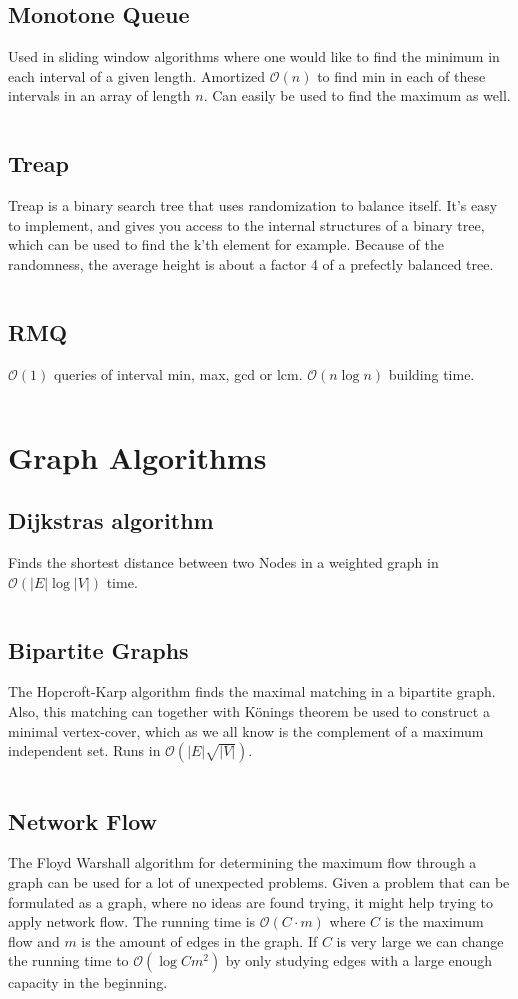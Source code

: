 \documentclass[8pt,a4paper,landscape,oneside]{amsart}
\newcommand{\codej}[1]{\inputminted[fontsize=\large,tabsize=2,baselinestretch=1]{java}{code/#1}}
\newcommand{\codep}[1]{\inputminted[fontsize=\large,tabsize=2,baselinestretch=1]{py}{code/#1}}
\newcommand{\bigO}{\mathcal{O}}
\begin{document}
\begin{multicols*}{2}
\begin{large}
    \subsection{Monotone Queue}
        Used in sliding window algorithms where one would like to find the minimum in each interval of a given length. Amortized $\bigO(n)$ to find min in each of these intervals in an array of length $n$. Can easily be used to find the maximum as well.
        \codej{DS/MinMonQue.java}
    \subsection{Treap}
        Treap is a binary search tree that uses randomization to balance itself. 
        It's easy to implement, and gives you access to the internal structures of a binary tree, 
        which can be used to find the k'th element for example. Because of the randomness, the average height is about a factor 4 of a prefectly balanced tree.
        \codej{DS/Treap.java}
    \subsection{RMQ}
        $\bigO(1)$ queries of interval min, max, gcd or lcm. $\bigO(n \log n)$ building time.
        \codep{DS/RMQ.py}
\section{Graph Algorithms}
    \subsection{Dijkstras algorithm}
        Finds the shortest distance between two Nodes in a weighted graph in $\bigO (|E| \log{|V|})$ time.
        \codep{Graphs/dijkstra.py}
    \subsection{Bipartite Graphs}
        The Hopcroft-Karp algorithm finds the maximal matching in a bipartite graph. Also, this matching can together with Könings theorem be used to construct a minimal vertex-cover, which as we all know is the complement of a maximum independent set. Runs in $\bigO (|E|\sqrt{|V|})$. 
        \codej{Graphs/BiGraph.java}
    \subsection{Network Flow}
        The Floyd Warshall algorithm for determining the maximum flow through a graph can be used for a lot of unexpected problems. Given a problem that can be formulated as a graph, where no ideas are found trying, it might help trying to apply network flow. The running time is $\bigO (C \cdot m)$ where $C$ is the maximum flow and $m$ is the amount of edges in the graph. 
        If $C$ is very large we can change the running time to $\bigO (\log{C}m^2)$ by only studying edges with a large enough capacity in the beginning.
        \codep{Graphs/flow.py}

\end{large}
\end{multicols*}
\end{document}
